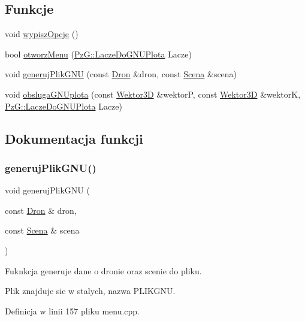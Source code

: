 \subsection*{Funkcje}
\begin{DoxyCompactItemize}
\item 
void \mbox{\hyperlink{menu_8hh_a94d72e7cfca9043780b1dda5a01e9632}{wypisz\+Opcje}} ()
\item 
bool \mbox{\hyperlink{menu_8hh_a32a0a14b80567d267e3e6d831c2a517b}{otworz\+Menu}} (\mbox{\hyperlink{class_pz_g_1_1_lacze_do_g_n_u_plota}{Pz\+G\+::\+Lacze\+Do\+G\+N\+U\+Plota}} Lacze)
\item 
void \mbox{\hyperlink{menu_8hh_a924b8ff013a18f0f1f0fdbdda6538e07}{generuj\+Plik\+G\+NU}} (const \mbox{\hyperlink{class_dron}{Dron}} \&dron, const \mbox{\hyperlink{class_scena}{Scena}} \&scena)
\item 
void \mbox{\hyperlink{menu_8hh_a233cd71579a56ad0b2926d4c5217eaa1}{obsluga\+G\+N\+Uplota}} (const \mbox{\hyperlink{class_wektor3_d}{Wektor3D}} \&wektorP, const \mbox{\hyperlink{class_wektor3_d}{Wektor3D}} \&wektorK, \mbox{\hyperlink{class_pz_g_1_1_lacze_do_g_n_u_plota}{Pz\+G\+::\+Lacze\+Do\+G\+N\+U\+Plota}} Lacze)
\end{DoxyCompactItemize}


\subsection{Dokumentacja funkcji}
\mbox{\label{menu_8hh_a924b8ff013a18f0f1f0fdbdda6538e07}} 
\subsubsection{\texorpdfstring{generujPlikGNU()}{generujPlikGNU()}}
{\footnotesize\ttfamily void generuj\+Plik\+G\+NU (\begin{DoxyParamCaption}\item[{const \mbox{\hyperlink{class_dron}{Dron}} \&}]{dron,  }\item[{const \mbox{\hyperlink{class_scena}{Scena}} \&}]{scena }\end{DoxyParamCaption})}

Fuknkcja generuje dane o dronie oraz scenie do pliku.

Plik znajduje sie w stalych, nazwa P\+L\+I\+K\+G\+NU. 

Definicja w linii 157 pliku menu.\+cpp.

